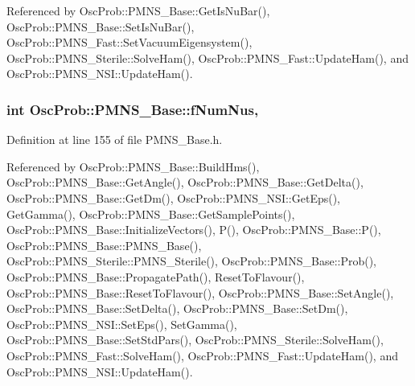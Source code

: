 Referenced by Osc\+Prob\+::\+P\+M\+N\+S\+\_\+\+Base\+::\+Get\+Is\+Nu\+Bar(), Osc\+Prob\+::\+P\+M\+N\+S\+\_\+\+Base\+::\+Set\+Is\+Nu\+Bar(), Osc\+Prob\+::\+P\+M\+N\+S\+\_\+\+Fast\+::\+Set\+Vacuum\+Eigensystem(), Osc\+Prob\+::\+P\+M\+N\+S\+\_\+\+Sterile\+::\+Solve\+Ham(), Osc\+Prob\+::\+P\+M\+N\+S\+\_\+\+Fast\+::\+Update\+Ham(), and Osc\+Prob\+::\+P\+M\+N\+S\+\_\+\+N\+S\+I\+::\+Update\+Ham().

\subsubsection[{\texorpdfstring{f\+Num\+Nus}{fNumNus}}]{\setlength{\rightskip}{0pt plus 5cm}int Osc\+Prob\+::\+P\+M\+N\+S\+\_\+\+Base\+::f\+Num\+Nus\hspace{0.3cm}{\ttfamily [protected]}, {\ttfamily [inherited]}}\hypertarget{classOscProb_1_1PMNS__Base_a24bb74bed63569dfe88b18fa6a08060e}{}\label{classOscProb_1_1PMNS__Base_a24bb74bed63569dfe88b18fa6a08060e}


Definition at line 155 of file P\+M\+N\+S\+\_\+\+Base.\+h.



Referenced by Osc\+Prob\+::\+P\+M\+N\+S\+\_\+\+Base\+::\+Build\+Hms(), Osc\+Prob\+::\+P\+M\+N\+S\+\_\+\+Base\+::\+Get\+Angle(), Osc\+Prob\+::\+P\+M\+N\+S\+\_\+\+Base\+::\+Get\+Delta(), Osc\+Prob\+::\+P\+M\+N\+S\+\_\+\+Base\+::\+Get\+Dm(), Osc\+Prob\+::\+P\+M\+N\+S\+\_\+\+N\+S\+I\+::\+Get\+Eps(), Get\+Gamma(), Osc\+Prob\+::\+P\+M\+N\+S\+\_\+\+Base\+::\+Get\+Sample\+Points(), Osc\+Prob\+::\+P\+M\+N\+S\+\_\+\+Base\+::\+Initialize\+Vectors(), P(), Osc\+Prob\+::\+P\+M\+N\+S\+\_\+\+Base\+::\+P(), Osc\+Prob\+::\+P\+M\+N\+S\+\_\+\+Base\+::\+P\+M\+N\+S\+\_\+\+Base(), Osc\+Prob\+::\+P\+M\+N\+S\+\_\+\+Sterile\+::\+P\+M\+N\+S\+\_\+\+Sterile(), Osc\+Prob\+::\+P\+M\+N\+S\+\_\+\+Base\+::\+Prob(), Osc\+Prob\+::\+P\+M\+N\+S\+\_\+\+Base\+::\+Propagate\+Path(), Reset\+To\+Flavour(), Osc\+Prob\+::\+P\+M\+N\+S\+\_\+\+Base\+::\+Reset\+To\+Flavour(), Osc\+Prob\+::\+P\+M\+N\+S\+\_\+\+Base\+::\+Set\+Angle(), Osc\+Prob\+::\+P\+M\+N\+S\+\_\+\+Base\+::\+Set\+Delta(), Osc\+Prob\+::\+P\+M\+N\+S\+\_\+\+Base\+::\+Set\+Dm(), Osc\+Prob\+::\+P\+M\+N\+S\+\_\+\+N\+S\+I\+::\+Set\+Eps(), Set\+Gamma(), Osc\+Prob\+::\+P\+M\+N\+S\+\_\+\+Base\+::\+Set\+Std\+Pars(), Osc\+Prob\+::\+P\+M\+N\+S\+\_\+\+Sterile\+::\+Solve\+Ham(), Osc\+Prob\+::\+P\+M\+N\+S\+\_\+\+Fast\+::\+Solve\+Ham(), Osc\+Prob\+::\+P\+M\+N\+S\+\_\+\+Fast\+::\+Update\+Ham(), and Osc\+Prob\+::\+P\+M\+N\+S\+\_\+\+N\+S\+I\+::\+Update\+Ham().

